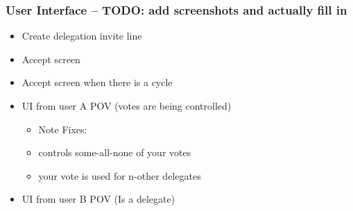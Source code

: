 \subsubsection{User Interface -- TODO: add screenshots and actually fill in}
\begin{itemize}
\item Create delegation invite line
\item Accept screen
\item Accept screen when there is a cycle
\item UI from user A POV (votes are being controlled)
\begin{itemize}
  \item Note Fixes:
  \item controls some-all-none of your votes
  \item your vote is used for n-other delegates
\end{itemize}
\item UI from user B POV (Is a delegate)
\end{itemize}

